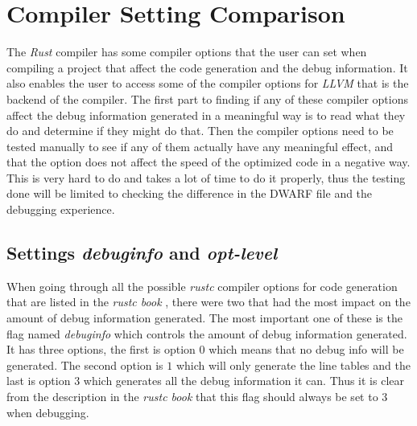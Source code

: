 \section{Compiler Setting Comparison}
\label{sec:settingscomparison}


The \emph{Rust} compiler has some compiler options that the user can set when compiling a project that affect the code generation and the debug information.
It also enables the user to access some of the compiler options for \emph{LLVM} that is the backend of the compiler.
The first part to finding if any of these compiler options affect the debug information generated in a meaningful way is to read what they do and determine if they might do that.
Then the compiler options need to be tested manually to see if any of them actually have any meaningful effect, and that the option does not affect the speed of the optimized code in a negative way.
This is very hard to do and takes a lot of time to do it properly, thus the testing done will be limited to checking the difference in the \gls{DWARF} file and the debugging experience.


\subsection{Settings \emph{debuginfo} and \emph{opt-level}}
When going through all the possible \emph{rustc} compiler options for code generation that are listed in the \emph{rustc book} \cite{rustc-book-codegen}, there were two that had the most impact on the amount of debug information generated.
The most important one of these is the flag named \emph{debuginfo} which controls the amount of debug information generated.
It has three options, the first is option $0$ which means that no debug info will be generated.
The second option is $1$ which will only generate the line tables and the last is option $3$ which generates all the debug information it can.
Thus it is clear from the description in the \emph{rustc book} that this flag should always be set to $3$ when debugging.


